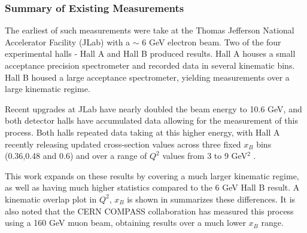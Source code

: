         \subsubsection*{Summary of Existing Measurements}

         The earliest of such measurements were take at the Thomas Jefferson National Accelerator Facility (JLab) with a $\sim$ 6 GeV electron beam. Two of the four experimental halls - Hall A \parencite{Fuchey2011ExclusiveRegime} and Hall B \parencite{Bedlinskiy2014ExclusiveCLAS} produced \xsec results. Hall A houses a small acceptance precision spectrometer and recorded data in several kinematic bins. Hall B housed a large acceptance spectrometer, yielding \xsec measurements over a large kinematic regime. 
         
         Recent upgrades at JLab have nearly doubled the beam energy to 10.6 GeV, and both detector halls have accumulated data allowing for the measurement of this process. Both halls repeated data taking at this higher energy, with Hall A recently releasing updated cross-section values across three fixed $x_B$ bins (0.36,0.48 and 0.6) and over a range of $Q^2$ values from 3 to 9 GeV$^2$ \parencite{Dlamini2021DeepRegime}. 
         
         This work expands on these results by covering a much larger kinematic regime, as well as having much higher statistics compared to the 6 GeV Hall B result. A kinematic overlap plot in $Q^2$, $x_B$ is shown in  summarizes these differences. It is also noted that the CERN COMPASS collaboration \parencite{Alexeev2020MeasurementProton} has measured this process using a 160 GeV muon beam, obtaining results over a much lower $x_B$ range.  

       
    
